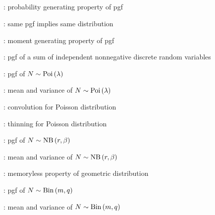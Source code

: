 \subsection*{}
\item {}: probability generating property of pgf
\item {}: same pgf implies same distribution
\item {}: moment generating property of pgf
\item {}: pgf of a sum of independent nonnegative discrete random variables
\item {}: pgf of \(N\sim\operatorname{Poi}\left(\lambda\right)\)
\item {}: mean and variance of \(N\sim\operatorname{Poi}\left(\lambda\right)\)
\item {}: convolution for Poisson distribution
\item {}: thinning for Poisson distribution
\item {}: pgf of \(N\sim\operatorname{NB}\left(r,\beta\right)\)
\item {}: mean and variance of \(N\sim\operatorname{NB}\left(r,\beta\right)\)
\item {}: memoryless property of geometric distribution
\item {}: pgf of \(N\sim\operatorname{Bin}\left(m,q\right)\)
\item {}: mean and variance of \(N\sim\operatorname{Bin}\left(m,q\right)\)
